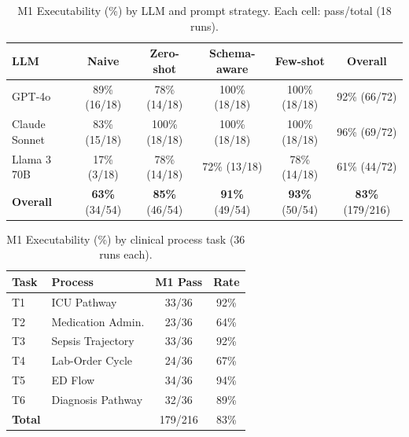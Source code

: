 
\begin{table}[t]
  \caption{M1 Executability (\%) by LLM and prompt strategy. Each cell: pass/total (18 runs).}\label{tab:m1grid}
  \centering
  \begin{tabular}{@{}lccccc@{}}
    \toprule
    \textbf{LLM} & \textbf{Naive} & \textbf{Zero-shot} & \textbf{Schema-aware} & \textbf{Few-shot} & \textbf{Overall} \\
    \midrule
    GPT-4o & 89\% (16/18) & 78\% (14/18) & 100\% (18/18) & 100\% (18/18) & 92\% (66/72) \\
    Claude Sonnet & 83\% (15/18) & 100\% (18/18) & 100\% (18/18) & 100\% (18/18) & 96\% (69/72) \\
    Llama 3 70B & 17\% (3/18) & 78\% (14/18) & 72\% (13/18) & 78\% (14/18) & 61\% (44/72) \\
    \midrule
    \textbf{Overall} & \textbf{63\%} (34/54) & \textbf{85\%} (46/54) & \textbf{91\%} (49/54) & \textbf{93\%} (50/54) & \textbf{83\%} (179/216) \\
    \bottomrule
  \end{tabular}
\end{table}

\begin{table}[t]
  \caption{M1 Executability (\%) by clinical process task (36 runs each).}\label{tab:m1task}
  \centering
  \begin{tabular}{@{}llcc@{}}
    \toprule
    \textbf{Task} & \textbf{Process} & \textbf{M1 Pass} & \textbf{Rate} \\
    \midrule
    T1 & ICU Pathway & 33/36 & 92\% \\
    T2 & Medication Admin. & 23/36 & 64\% \\
    T3 & Sepsis Trajectory & 33/36 & 92\% \\
    T4 & Lab-Order Cycle & 24/36 & 67\% \\
    T5 & ED Flow & 34/36 & 94\% \\
    T6 & Diagnosis Pathway & 32/36 & 89\% \\
    \midrule
    \textbf{Total} & & 179/216 & 83\% \\
    \bottomrule
  \end{tabular}
\end{table}

